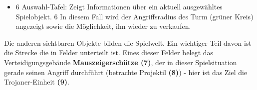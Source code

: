 \begin{itemize}[leftmargin=*]
	\item {$6$ Auswahl-Tafel: Zeigt Informationen über ein aktuell ausgewähltes Spielobjekt.} \(6\) In diesem Fall wird der Angriffsradius des Turm (grüner Kreis) angezeigt sowie die Möglichkeit, ihn wieder zu verkaufen.
\end{itemize}
Die anderen sichtbaren Objekte bilden die Spielwelt. Ein wichtiger Teil davon ist die Strecke die in Felder unterteilt ist. Eines dieser Felder belegt das Verteidigungsgebäude \textbf{Mauszeigerschütze (7)}, der in dieser Spielsituation gerade seinen Angriff durchführt (betrachte Projektil \textbf{(8)}) - hier ist das Ziel die Trojaner-Einheit \textbf{(9)}.

